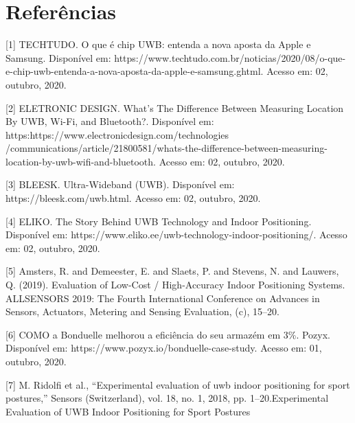 \chapter{Referências}
[1] TECHTUDO. O que é chip UWB: entenda a nova aposta da Apple e Samsung. Disponível em: https://www.techtudo.com.br/noticias/2020/08/o-que-e-chip-uwb-entenda-a-nova-aposta-da-apple-e-samsung.ghtml. Acesso em: 02, outubro, 2020.

[2] ELETRONIC DESIGN. What’s The Difference Between Measuring Location By UWB, Wi-Fi, and Bluetooth?. Disponível em: https:https://www.electronicdesign.com/technologies
/communications/article/21800581/whats-the-difference-between-measuring-location-by-uwb-wifi-and-bluetooth. Acesso em: 02, outubro, 2020.

[3] BLEESK. Ultra-Wideband (UWB). Disponível em: https://bleesk.com/uwb.html. Acesso em: 02, outubro, 2020.

[4] ELIKO. The Story Behind UWB Technology and Indoor Positioning. Disponível em: https://www.eliko.ee/uwb-technology-indoor-positioning/. Acesso em: 02, outubro, 2020.

[5] Amsters, R. and Demeester, E. and Slaets, P. and Stevens, N. and Lauwers, Q. (2019). Evaluation of Low-Cost / High-Accuracy Indoor Positioning Systems. ALLSENSORS 2019: The Fourth International Conference on Advances in Sensors, Actuators, Metering and Sensing Evaluation, (c), 15–20.

[6] COMO a Bonduelle melhorou a eficiência do seu armazém em 3\%. Pozyx. Disponível em: https://www.pozyx.io/bonduelle-case-study. Acesso em: 01, outubro, 2020.

[7] M. Ridolfi et al., “Experimental evaluation of uwb indoor positioning for sport postures,” Sensors (Switzerland), vol. 18, no. 1, 2018, pp. 1–20.Experimental Evaluation of UWB Indoor Positioning for Sport Postures